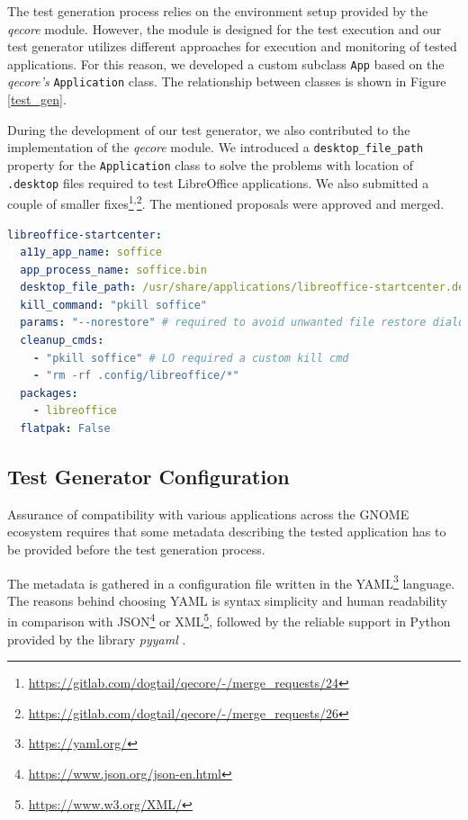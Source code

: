 The test generation process relies on the environment setup provided by the \textit{qecore} module. However, the module is designed for the test execution and our test generator utilizes different approaches for execution and monitoring of tested applications. For this reason, we developed a custom subclass \texttt{App} based on the \textit{qecore's} \texttt{Application} class. The relationship between classes is shown in Figure \ref{test_gen}. 

During the development of our test generator, we also contributed to the implementation of the \textit{qecore} module. We introduced a \texttt{desktop\_file\_path} property for the \texttt{Application} class to solve the problems with location of \texttt{.desktop} files required to test LibreOffice applications. We also submitted a couple of smaller
fixes\footnote{\url{https://gitlab.com/dogtail/qecore/-/merge_requests/24}}\textsuperscript{,}\footnote{\url{https://gitlab.com/dogtail/qecore/-/merge_requests/26}}. The mentioned proposals were approved and merged.

\begin{lstlisting}[language=yaml,caption={
An example of the apps.yaml entry for LibreOffice StartCenter},label={apps_yaml}]
libreoffice-startcenter:
  a11y_app_name: soffice
  app_process_name: soffice.bin
  desktop_file_path: /usr/share/applications/libreoffice-startcenter.desktop
  kill_command: "pkill soffice"
  params: "--norestore" # required to avoid unwanted file restore dialogs
  cleanup_cmds:
    - "pkill soffice" # LO required a custom kill cmd
    - "rm -rf .config/libreoffice/*"
  packages:
    - libreoffice
  flatpak: False
\end{lstlisting}

\subsection{Test Generator Configuration}\label{env_config}

Assurance of compatibility with various applications across the GNOME ecosystem requires that some metadata describing the tested application has to be provided before the test generation process. 

The metadata is gathered in a configuration file written in the YAML\footnote{\url{https://yaml.org/}} language. The reasons behind choosing YAML is syntax simplicity and human readability in comparison with JSON\footnote{\url{https://www.json.org/json-en.html}} or XML\footnote{\url{https://www.w3.org/XML/}}, followed by the reliable support in Python provided by the library \textit{pyyaml} \cite{yaml}.

